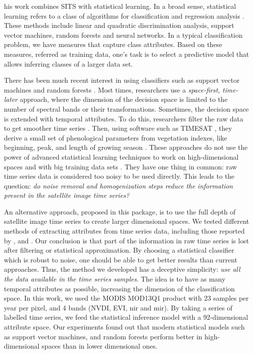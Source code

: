 \documentclass[article]{jss}
\begin{document}
his work combines SITS with statistical learning. In a broad sense,
statistical learning refers to a class of algorithms for classification
and regression analysis \citep{Hastie2009}. These methods include linear
and quadratic discrimination analysis, support vector machines, random
forests and neural networks. In a typical classification problem, we
have measures that capture class attributes. Based on these measures,
referred as training data, one's task is to select a predictive model
that allows inferring classes of a larger data set.

There has been much recent interest in using classifiers such as support
vector machines \citep{Mountrakis2011} and random forests
\citep{Belgiu2016}. Most times, researchers use a
\emph{space-first, time-later} approach, where the dimension of the
decision space is limited to the number of spectral bands or their
transformations. Sometimes, the decision space is extended with temporal
attributes. To do this, researchers filter the raw data to get smoother
time series \citep{Brown2013, Kastens2017}. Then, using software such as
TIMESAT \citep{Jonsson2004}, they derive a small set of phenological
parameters from vegetation indexes, like beginning, peak, and length of
growing season \citep{Estel2015, Pelletier2016}. These approaches do not
use the power of advanced statistical learning techniques to work on
high-dimensional spaces and with big training data sets
\citep{James2013}. They have one thing in common: raw time series data
is considered too noisy to be used directly. This leads to the question:
\emph{do noise removal and homogenization steps reduce the information present in the satellite image time series?}

An alternative approach, proposed in this package, is to use the full
depth of satellite image time series to create larger dimensional
spaces. We tested different methods of extracting attributes from time
series data, including those reported by \cite{Maus2016},
\cite{Pelletier2016} and \cite{Kastens2017}. Our conclusion is that part
of the information in raw time series is lost after filtering or
statistical approximation. By choosing a statistical classifier which is
robust to noise, one should be able to get better results than current
approaches. Thus, the method we developed has a deceptive simplicity:
\emph{use all the data available in the time series samples}. The idea
is to have as many temporal attributes as possible, increasing the
dimension of the classification space. In this work, we used the MODIS
MOD13Q1 product with 23 samples per year per pixel, and 4 bands (NVDI,
EVI, nir and mir). By taking a series of labelled time series, we feed
the statistical inference model with a 92-dimensional attribute space.
Our experiments found out that modern statistical models such as support
vector machines, and random forests perform better in high-dimensional
spaces than in lower dimensional ones.
\end{document}
